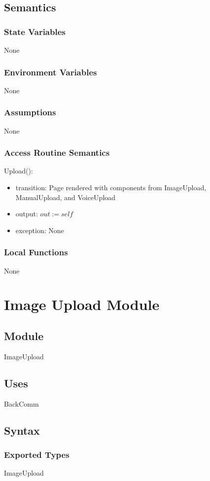 \documentclass[12pt, titlepage]{article}
\begin{document}
\subsection{Semantics}
\subsubsection{State Variables}
None
\subsubsection{Environment Variables}
None
\subsubsection{Assumptions}
None
\subsubsection{Access Routine Semantics}
\noindent Upload():
\begin{itemize}
	\item transition: Page rendered with components from ImageUpload, ManualUpload, and VoiceUpload
	\item output: $out := self$
	\item exception: None
\end{itemize}
\subsubsection{Local Functions}
None

\newpage

\section{Image Upload Module} \label{ImageUpload} 
\subsection{Module}
ImageUpload
\subsection{Uses}
BackComm
\subsection{Syntax}
\subsubsection{Exported Types}
ImageUpload
\end{document}

